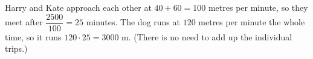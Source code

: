 Harry and Kate approach each other at $40+60=100$ metres per minute, so they meet after $\dfrac{2500}{100}=25$ minutes. The dog runs at $120$ metres per minute the whole time, so it runs $120\cdot25=\boxed{3000\text{ m}}$. (There is no need to add up the individual trips.)
